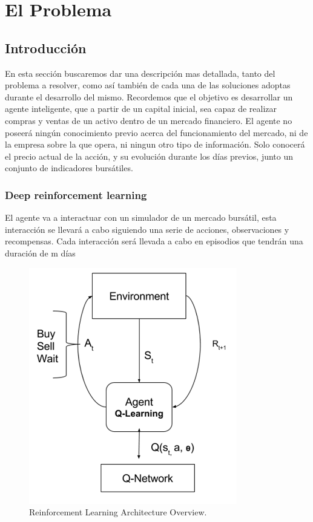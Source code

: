 \chapter{El Problema}


\section{Introducción}

En esta sección buscaremos dar una descripción mas detallada, tanto del problema a resolver, como así también de cada una de las soluciones adoptas durante el desarrollo del mismo.
Recordemos que el objetivo es desarrollar un agente inteligente, que a partir de un capital inicial, sea capaz de realizar compras y ventas de un activo dentro de un mercado financiero. El agente no poseerá ningún conocimiento previo acerca del funcionamiento del mercado, ni de la empresa sobre la que opera, ni ningun otro tipo de información. Solo conocerá el precio actual de la acción, y su evolución durante los días previos, junto un conjunto de indicadores bursátiles. 

\subsection{Deep reinforcement learning}

El agente va a interactuar con un simulador de un mercado bursátil, esta interacción se llevará a cabo siguiendo una serie de acciones, observaciones y recompensas.
Cada interacción será llevada a cabo en episodios que tendrán una duración de m días

\begin{figure}
	\begin{center}
	\includegraphics{imagenes/deepRLOverview.png}
	\end{center}
	\caption{Reinforcement Learning Architecture Overview.}
\end{figure}



